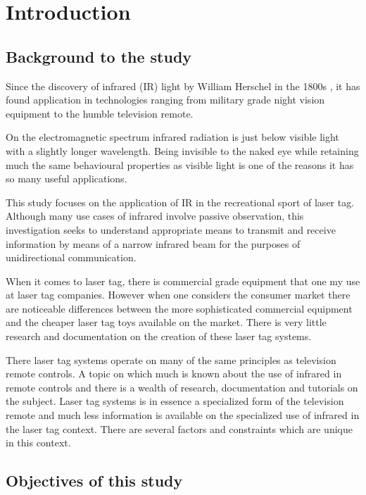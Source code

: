 \chapter{Introduction}
\label{ch_introduction}

\section{Background to the study}
Since the discovery of infrared (IR) light by William Herschel in the 1800s \cite{Rowan-Robinson2013}, it has found application in technologies ranging from military grade night vision equipment to the humble television remote.

On the electromagnetic spectrum infrared radiation is just below visible light with a slightly longer wavelength. Being invisible to the naked eye while retaining much the same behavioural properties as visible light is one of the reasons it has so many useful applications.

This study focuses on the application of IR in the recreational sport of laser tag. Although many use cases of infrared involve passive observation, this investigation seeks to understand appropriate means to transmit and receive information by means of a narrow infrared beam for the purposes of unidirectional communication.

When it comes to laser tag, there is commercial grade equipment that one my use at laser tag companies. However when one considers the consumer market there are noticeable differences between the more sophisticated commercial equipment and the cheaper laser tag toys available on the market. There is very little research and documentation on the creation of these laser tag systems.

There laser tag systems operate on many of the same principles as television remote controls. A topic on which much is known about the use of infrared in remote controls and there is a wealth of research, documentation and tutorials on the subject. Laser tag systems is in essence a specialized form of the television remote and much less information is available on the specialized use of infrared in the laser tag context. There are several factors and constraints which are unique in this context.



\section{Objectives of this study}

